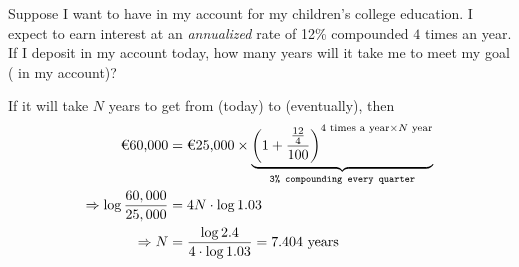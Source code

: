 

\question[3]  Suppose I want to have  in my account for my children's college education. 
I expect to earn interest at an \textit{annualized} rate of 12\% compounded $4$ times an year. 
If I deposit  in my account today, how many years will it take me to meet my goal 
(  in my account)?


\ifprintanswers
\fi 

\begin{solution}[\halfpage]
  If it will take $N$ years to get from  (today) to  (eventually), then 
	\begin{align}
    \text{\texteuro{60,000}} &= \text{\texteuro{25,000}}\times
    \underbrace{\left( 1 + \dfrac{\frac{12}{4}}{100} \right)^{4\text{ times a year}\times N\text{ year}}}
    _{\texttt{3\% compounding every quarter}}\\
    \Rightarrow \log \dfrac{60,000}{25,000} &= 4N\cdot\log 1.03 \\
    \Rightarrow N &= \dfrac{\log 2.4}{4\cdot\log 1.03} = 7.404\text{ years}
	\end{align}
\end{solution}
